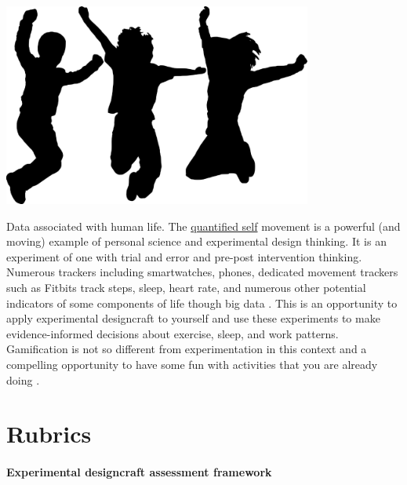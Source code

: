 \documentclass[
]{book}
\begin{document}
\includegraphics[width=4in,height=\textheight]{./humans.png}

Data associated with human life. The \href{https://quantifiedself.com}{quantified self} movement is a powerful (and moving) example of personal science and experimental design thinking. It is an experiment of one with trial and error and pre-post intervention thinking. Numerous trackers including smartwatches, phones, dedicated movement trackers such as Fitbits track steps, sleep, heart rate, and numerous other potential indicators of some components of life though big data \citep{RN6807}. This is an opportunity to apply experimental designcraft to yourself and use these experiments to make evidence-informed decisions about exercise, sleep, and work patterns. Gamification is not so different from experimentation in this context and a compelling opportunity to have some fun with activities that you are already doing \citep{RN6808}.

\hypertarget{rubrics}{%
\chapter{Rubrics}\label{rubrics}}

\hypertarget{experimental-designcraft-assessment-framework}{%
\subsubsection*{Experimental designcraft assessment framework}\label{experimental-designcraft-assessment-framework}}
\end{document}
